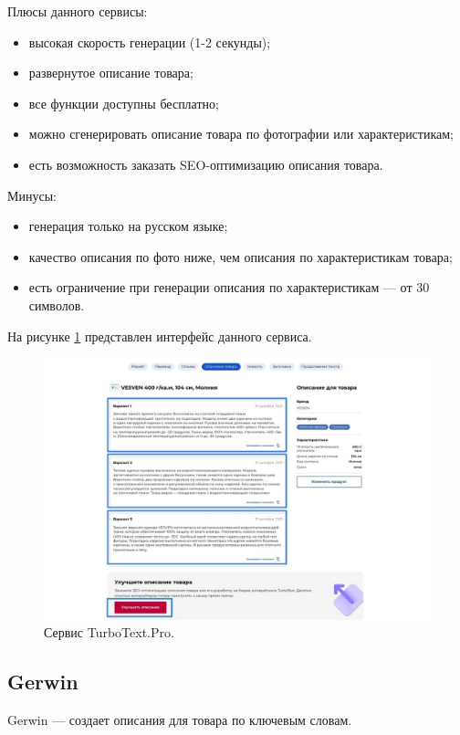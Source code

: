 \documentclass[a4paper,12pt]{extarticle}
\begin{document}
Плюсы данного сервисы:
\begin{itemize}
	\item высокая скорость генерации (1-2 секунды);
	\item развернутое описание товара;
	\item все функции доступны бесплатно;
	\item можно сгенерировать описание товара по фотографии или характеристикам;
	\item есть возможность заказать SEO-оптимизацию описания товара.
\end{itemize}

Минусы:
\begin{itemize}
	\item генерация только на русском языке;
	\item качество описания по фото ниже, чем описания по характеристикам товара;
	\item есть ограничение при генерации описания по характеристикам — от 30 символов.
\end{itemize}

На рисунке \ref{fig:turbotextpro} представлен интерфейс данного сервиса.

\begin{figure}[ht]
	\centering
	\includegraphics[scale=0.4]{turbotextpro.png}
	\caption{Сервис TurboText.Pro.}
	\label{fig:turbotextpro}
\end{figure}

\newpage
\subsection{Gerwin}

Gerwin — создает описания для товара по ключевым словам.
\end{document}

